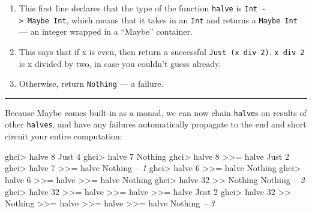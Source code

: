 \documentclass[]{article}
\newenvironment{Shaded}{}{}
\newcommand{\DataTypeTok}[1]{\textcolor[rgb]{0.56,0.13,0.00}{#1}}
\newcommand{\DecValTok}[1]{\textcolor[rgb]{0.25,0.63,0.44}{#1}}
\newcommand{\CommentTok}[1]{\textcolor[rgb]{0.38,0.63,0.69}{\textit{#1}}}
\newcommand{\FunctionTok}[1]{\textcolor[rgb]{0.02,0.16,0.49}{#1}}
\newcommand{\NormalTok}[1]{#1}
\begin{document}
\begin{enumerate}
\def\labelenumi{\arabic{enumi}.}
\tightlist
\item
  This first line declares that the type of the function \texttt{halve} is
  \texttt{Int\ -\textgreater{}\ Maybe\ Int}, which means that it takes in an
  \texttt{Int} and returns a \texttt{Maybe\ Int} --- an integer wrapped in a
  ``Maybe'' container.
\item
  This says that if x is even, then return a successful
  \texttt{Just\ (x\ \textasciigrave{}div\textasciigrave{}\ 2)}.
  \texttt{x\ \textasciigrave{}div\textasciigrave{}\ 2} is x divided by two, in
  case you couldn't guess already.
\item
  Otherwise, return \texttt{Nothing} --- a failure.
\end{enumerate}

\begin{center}\rule{0.5\linewidth}{\linethickness}\end{center}

Because Maybe comes built-in as a monad, we can now chain \texttt{halve}s on
results of other \texttt{halves}, and have any failures automatically propagate
to the end and short circuit your entire computation:

\begin{Shaded}
\begin{Highlighting}[]
\NormalTok{ghci}\FunctionTok{>}\NormalTok{ halve }\DecValTok{8}
\DataTypeTok{Just} \DecValTok{4}
\NormalTok{ghci}\FunctionTok{>}\NormalTok{ halve }\DecValTok{7}
\DataTypeTok{Nothing}
\NormalTok{ghci}\FunctionTok{>}\NormalTok{ halve }\DecValTok{8} \FunctionTok{>>=}\NormalTok{ halve}
\DataTypeTok{Just} \DecValTok{2}
\NormalTok{ghci}\FunctionTok{>}\NormalTok{ halve }\DecValTok{7} \FunctionTok{>>=}\NormalTok{ halve}
\DataTypeTok{Nothing}                         \CommentTok{-- 1}
\NormalTok{ghci}\FunctionTok{>}\NormalTok{ halve }\DecValTok{6} \FunctionTok{>>=}\NormalTok{ halve}
\DataTypeTok{Nothing}
\NormalTok{ghci}\FunctionTok{>}\NormalTok{ halve }\DecValTok{6} \FunctionTok{>>=}\NormalTok{ halve }\FunctionTok{>>=}\NormalTok{ halve}
\DataTypeTok{Nothing}
\NormalTok{ghci}\FunctionTok{>}\NormalTok{ halve }\DecValTok{32} \FunctionTok{>>} \DataTypeTok{Nothing}
\DataTypeTok{Nothing}                         \CommentTok{-- 2}
\NormalTok{ghci}\FunctionTok{>}\NormalTok{ halve }\DecValTok{32} \FunctionTok{>>=}\NormalTok{ halve }\FunctionTok{>>=}\NormalTok{ halve }\FunctionTok{>>=}\NormalTok{ halve}
\DataTypeTok{Just} \DecValTok{2}
\NormalTok{ghci}\FunctionTok{>}\NormalTok{ halve }\DecValTok{32} \FunctionTok{>>} \DataTypeTok{Nothing} \FunctionTok{>>=}\NormalTok{ halve }\FunctionTok{>>=}\NormalTok{ halve }\FunctionTok{>>=}\NormalTok{ halve}
\DataTypeTok{Nothing}                         \CommentTok{-- 3}
\end{Highlighting}
\end{Shaded}
\end{document}
